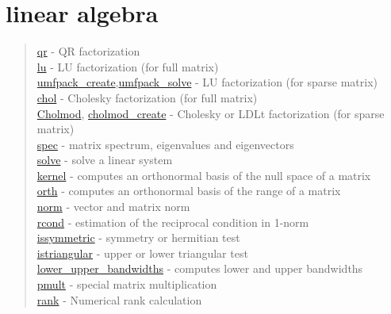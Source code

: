 \chapter*{linear algebra}

\begin{quote}
\noindent
\hyperlink{qr}{qr} - QR factorization \\
\hyperlink{lu}{lu} - LU factorization (for full matrix) \\
\hyperlink{umfpack_create}{umfpack\_create},\hyperlink{umfpack_solve}{umfpack\_solve}
- LU factorization (for sparse matrix) \\
\hyperlink{chol}{chol} - Cholesky factorization (for full matrix) \\
\hyperlink{Cholmod}{Cholmod}, \hyperlink{cholmod_create}{cholmod\_create} - Cholesky or LDLt factorization (for sparse matrix) \\
\hyperlink{spec}{spec} - matrix spectrum, eigenvalues and eigenvectors\\
\hyperlink{solve}{solve} - solve a linear system\\
\hyperlink{kernel}{kernel} - computes an orthonormal basis of the null space of a matrix\\
\hyperlink{orth}{orth} - computes an orthonormal basis of the range of a matrix\\
\hyperlink{norm}{norm} - vector and matrix norm\\
\hyperlink{rcond}{rcond} - estimation of the reciprocal condition in 1-norm\\
\hyperlink{issymmetric}{issymmetric} - symmetry or hermitian test\\
\hyperlink{istriangular}{istriangular} - upper or lower triangular test\\
\hyperlink{lower_upper_bandwidths}{lower\_upper\_bandwidths} - computes lower and upper bandwidths\\
\hyperlink{pmult}{pmult} - special matrix multiplication\\
\hyperlink{rank}{rank} - Numerical rank calculation \\
\end{quote}

 
 
 
 
 


 
 
 
 


